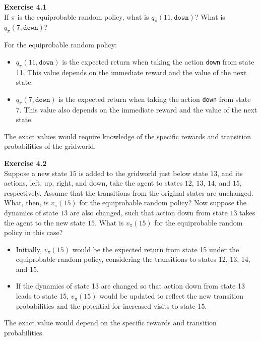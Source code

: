 \documentclass[addpoints]{exam}
\begin{document}
\begin{questions}
    \question
    \textbf{Exercise 4.1} \\ If \(\pi\) is the equiprobable random policy, what is \(q_{\pi}(11,\texttt{down})\)? What is \(q_{\pi}(7,\texttt{down})\)?
    \begin{solution}
        For the equiprobable random policy:
        \begin{itemize}
            \item \( q_{\pi}(11, \texttt{down}) \) is the expected return when taking the action \texttt{down} from state 11. This value depends on the immediate reward and the value of the next state.
            \item \( q_{\pi}(7, \texttt{down}) \) is the expected return when taking the action \texttt{down} from state 7. This value also depends on the immediate reward and the value of the next state.
        \end{itemize}
        The exact values would require knowledge of the specific rewards and transition probabilities of the gridworld.
    \end{solution}

    \question
    \textbf{Exercise 4.2} \\ Suppose a new state \(15\) is added to the gridworld just below state \(13\), and its actions, left, up, right, and down, take the agent to states \(12\), \(13\), \(14\), and \(15\), respectively. Assume that the transitions from the original states are unchanged. What, then, is $v_{\pi}(15)$ for the equiprobable random policy? Now suppose the dynamics of state \(13\) are also changed, such that action down from state \(13\) takes the agent to the new state \(15\). What is $v_{\pi}(15)$ for the equiprobable random policy in this case?
    \begin{solution}
        \begin{itemize}
            \item Initially, \( v_{\pi}(15) \) would be the expected return from state 15 under the equiprobable random policy, considering the transitions to states 12, 13, 14, and 15.
            \item If the dynamics of state 13 are changed so that action down from state 13 leads to state 15, \( v_{\pi}(15) \) would be updated to reflect the new transition probabilities and the potential for increased visits to state 15.
        \end{itemize}
        The exact value would depend on the specific rewards and transition probabilities.
    \end{solution}


\end{questions}
\end{document}
